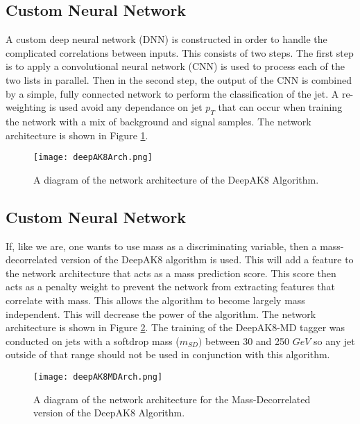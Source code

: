 \subsection{Custom Neural Network}

A custom deep neural network (DNN) is constructed in order to handle the complicated correlations between inputs.
This consists of two steps. The first step is to apply a convolutional neural network (CNN) is used to process each of the two lists in parallel.
Then in the second step, the output of the CNN is combined by a simple, fully connected network to perform the classification of the jet.
A re-weighting is used avoid any dependance on jet $p_T$ that can occur when training the network with a mix of background and signal samples.
The network architecture is shown in Figure \ref{fig:fig_4-2}.
\begin{figure} %
    \centering
    \texttt{[image: deepAK8Arch.png]}
    \caption{A diagram of the network architecture of the DeepAK8 Algorithm.}
    \label{fig:fig_4-2}
 \end{figure}
\subsection{Custom Neural Network}
If, like we are, one wants to use mass as a discriminating variable, then a mass-decorrelated version of the DeepAK8 algorithm is used.
This will add a feature to the network architecture that acts as a mass prediction score. This score then acts as a penalty weight to prevent the network from extracting features that correlate with mass.
This allows the algorithm to become largely mass independent. This will decrease the power of the algorithm. The network architecture is shown in Figure \ref{fig:fig_4-3}.
The training of the DeepAK8-MD tagger was conducted on jets with a softdrop mass ($m_{SD})$ between 30 and 250 $GeV$ so any jet outside of that range should not be used in conjunction with this algorithm.
\begin{figure} %
    \centering
    \texttt{[image: deepAK8MDArch.png]}
    \caption{A diagram of the network architecture for the Mass-Decorrelated version of the DeepAK8 Algorithm.}
    \label{fig:fig_4-3}
 \end{figure}

